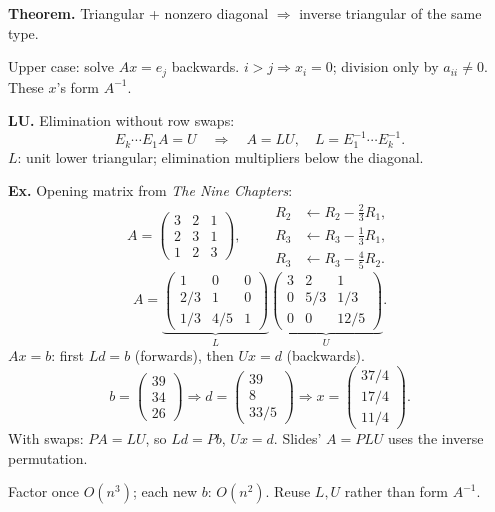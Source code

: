 \documentclass[11pt,letterpaper]{article}
\begin{document}
\textbf{Theorem.} Triangular + nonzero diagonal \(\Rightarrow\) inverse
triangular of the same type.

Upper case: solve \(Ax=e_j\) backwards. \(i>j\Rightarrow x_i=0\);
division only by \(a_{ii}\ne0\). These \(x\)'s form \(A^{-1}\).

\textbf{LU.} Elimination without row swaps: \[
E_k\cdots E_1A=U
\quad\Rightarrow\quad
A=LU,\quad L=E_1^{-1}\cdots E_k^{-1}.
\] \(L\): unit lower triangular; elimination multipliers below the
diagonal.

\textbf{Ex.} Opening matrix from \emph{The Nine Chapters}: \[
A=\begin{pmatrix}3&2&1\\2&3&1\\1&2&3\end{pmatrix},\qquad
\begin{aligned}
R_2&\leftarrow R_2-\tfrac23R_1,\\
R_3&\leftarrow R_3-\tfrac13R_1,\\
R_3&\leftarrow R_3-\tfrac45R_2.
\end{aligned}
\] \[
A=\underbrace{\begin{pmatrix}1&0&0\\2/3&1&0\\1/3&4/5&1\end{pmatrix}}_L
\underbrace{\begin{pmatrix}3&2&1\\0&5/3&1/3\\0&0&12/5\end{pmatrix}}_U.
\] \(Ax=b\): first \(Ld=b\) (forwards), then \(Ux=d\) (backwards). \[
b=\begin{pmatrix}39\\34\\26\end{pmatrix}
\Rightarrow d=\begin{pmatrix}39\\8\\33/5\end{pmatrix}
\Rightarrow x=\begin{pmatrix}37/4\\17/4\\11/4\end{pmatrix}.
\] With swaps: \(PA=LU\), so \(Ld=Pb\), \(Ux=d\). Slides' \(A=PLU\) uses
the inverse permutation.

Factor once \(O(n^3)\); each new \(b\): \(O(n^2)\). Reuse \(L,U\) rather
than form \(A^{-1}\).

\newpage
\end{document}
